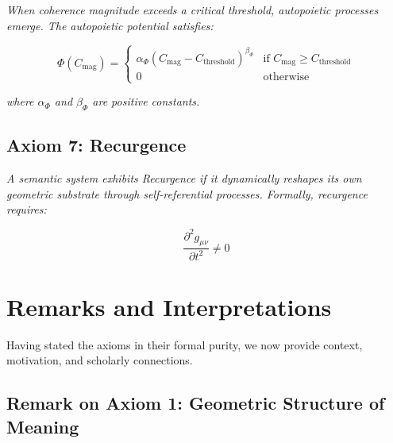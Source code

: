 \textit{When coherence magnitude exceeds a critical threshold, autopoietic processes emerge. The autopoietic potential satisfies:}

\begin{equation}
\Phi(C_{\text{mag}}) = \begin{cases}
\alpha_{\Phi} (C_{\text{mag}} - C_{\text{threshold}})^{\beta_{\Phi}} & \text{if } C_{\text{mag}} \geq C_{\text{threshold}} \\
0 & \text{otherwise}
\end{cases}
\end{equation}

\textit{where \(\alpha_{\Phi}\) and \(\beta_{\Phi}\) are positive constants.}


\subsection{Axiom 7: Recurgence}
\label{1.2.7:axiom_7_recurgence}

\textit{A semantic system exhibits Recurgence if it dynamically reshapes its own geometric substrate through self-referential processes. Formally, recurgence requires:}

\begin{equation}
\frac{\partial^2 g_{\mu\nu}}{\partial t^2} \neq 0
\end{equation}


\section{Remarks and Interpretations}
\label{1.3:remarks_and_interpretations}

Having stated the axioms in their formal purity, we now provide context, motivation, and scholarly connections.


\subsection{Remark on Axiom 1: Geometric Structure of Meaning}
\label{1.3.1:remark_1_1}

